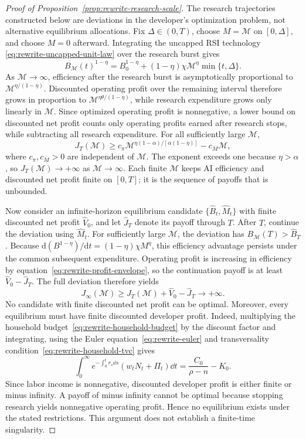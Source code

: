 \begin{proof}[Proof of Proposition~\ref{prop:rewrite-research-scale}]
The research trajectories constructed below are deviations in the
developer's optimization problem, not alternative equilibrium allocations.
Fix $\Delta\in(0,T)$, choose $M=\mathcal M$ on $[0,\Delta]$, and choose
$M=0$ afterward. Integrating the uncapped RSI technology
\eqref{eq:rewrite-uncapped-unit-law} over the research burst gives
\[
 B_{\mathcal M}(t)^{1-\eta}=B_0^{1-\eta}
 +(1-\eta)\chi\mathcal M^\eta\min\{t,\Delta\}.
\]
As $\mathcal M\to\infty$, efficiency after the research burst is
asymptotically proportional to
$\mathcal M^{\eta/(1-\eta)}$. Discounted operating profit over the remaining
interval therefore grows in proportion to
$\mathcal M^{\eta\theta/(1-\eta)}$, while research expenditure grows only
linearly in $\mathcal M$.
Since optimized operating profit is nonnegative, a lower bound on discounted
net profit counts only operating profits earned after research stops, while
subtracting all research expenditure. For all sufficiently large $\mathcal M$,
\begin{equation}
 J_T(\mathcal M)\geq c_\pi\mathcal M^{
 \eta(1-\alpha)/[\alpha(1-\eta)]}
 -c_M\mathcal M,
 \label{eq:rewrite-research-burst-payoff}
\end{equation}
where $c_\pi,c_M>0$ are independent of $\mathcal M$.
The exponent exceeds one because $\eta>\alpha$,
so $J_T(\mathcal M)\to+\infty$ as $\mathcal M\to\infty$.
Each finite $\mathcal M$ keeps AI efficiency and discounted net profit
finite on $[0,T]$; it is the sequence of payoffs that is unbounded.

Now consider an infinite-horizon equilibrium candidate
$\{\widehat B_t,\widehat M_t\}$ with finite discounted net profit
$\widehat V_0$, and let $\widehat J_T$ denote its payoff through $T$.
After $T$, continue the deviation using $\widehat M_t$.
For sufficiently large $\mathcal M$, the deviation has
$B_{\mathcal M}(T)>\widehat B_T$. Because
$\mathrm d(B^{1-\eta})/\mathrm dt=(1-\eta)\chi M^\eta$,
this efficiency advantage persists under the common subsequent expenditure.
Operating profit is increasing in efficiency by
equation~\eqref{eq:rewrite-profit-envelope}, so the continuation payoff is
at least $\widehat V_0-\widehat J_T$. The full deviation therefore yields
\[
 J_\infty(\mathcal M)\geq J_T(\mathcal M)
 +\widehat V_0-\widehat J_T\longrightarrow+\infty.
\]
No candidate with finite discounted net profit can be optimal.
Moreover, every equilibrium must have finite discounted developer profit.
Indeed, multiplying the household budget~\eqref{eq:rewrite-household-budget}
by the discount factor and integrating, using the Euler equation~\eqref{eq:rewrite-euler}
and transversality condition~\eqref{eq:rewrite-household-tvc} gives
\[
 \int_0^\infty
 e^{-\int_0^t r_s\dd s}(w_tN_t+\Pi_t)\dd t
 =\frac{C_0}{\rho-n}-K_0.
\]
Since labor income is nonnegative, discounted developer profit is
either finite or minus infinity. A payoff of minus infinity cannot be
optimal because
stopping research yields nonnegative operating profit.
Hence no equilibrium exists under the stated restrictions.
This argument does not establish a finite-time singularity.
\end{proof}
